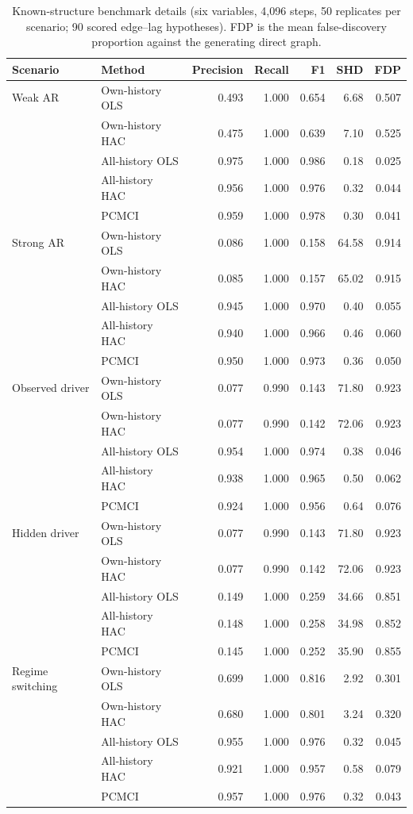 \documentclass[11pt]{article}
\begin{document}
\begin{table}[htbp]
\centering
\caption{Known-structure benchmark details (six variables, 4,096 steps, 50 replicates per scenario; 90 scored edge--lag hypotheses). FDP is the mean false-discovery proportion against the generating direct graph.}
\label{tab:s13}
\scriptsize
\begin{tabular}{@{}llrrrrr@{}}
\toprule
Scenario & Method & Precision & Recall & F1 & SHD & FDP \\
\midrule
Weak AR & Own-history OLS & 0.493 & 1.000 & 0.654 & 6.68 & 0.507 \\
 & Own-history HAC & 0.475 & 1.000 & 0.639 & 7.10 & 0.525 \\
 & All-history OLS & 0.975 & 1.000 & 0.986 & 0.18 & 0.025 \\
 & All-history HAC & 0.956 & 1.000 & 0.976 & 0.32 & 0.044 \\
 & PCMCI & 0.959 & 1.000 & 0.978 & 0.30 & 0.041 \\
\addlinespace
Strong AR & Own-history OLS & 0.086 & 1.000 & 0.158 & 64.58 & 0.914 \\
 & Own-history HAC & 0.085 & 1.000 & 0.157 & 65.02 & 0.915 \\
 & All-history OLS & 0.945 & 1.000 & 0.970 & 0.40 & 0.055 \\
 & All-history HAC & 0.940 & 1.000 & 0.966 & 0.46 & 0.060 \\
 & PCMCI & 0.950 & 1.000 & 0.973 & 0.36 & 0.050 \\
\addlinespace
Observed driver & Own-history OLS & 0.077 & 0.990 & 0.143 & 71.80 & 0.923 \\
 & Own-history HAC & 0.077 & 0.990 & 0.142 & 72.06 & 0.923 \\
 & All-history OLS & 0.954 & 1.000 & 0.974 & 0.38 & 0.046 \\
 & All-history HAC & 0.938 & 1.000 & 0.965 & 0.50 & 0.062 \\
 & PCMCI & 0.924 & 1.000 & 0.956 & 0.64 & 0.076 \\
\addlinespace
Hidden driver & Own-history OLS & 0.077 & 0.990 & 0.143 & 71.80 & 0.923 \\
 & Own-history HAC & 0.077 & 0.990 & 0.142 & 72.06 & 0.923 \\
 & All-history OLS & 0.149 & 1.000 & 0.259 & 34.66 & 0.851 \\
 & All-history HAC & 0.148 & 1.000 & 0.258 & 34.98 & 0.852 \\
 & PCMCI & 0.145 & 1.000 & 0.252 & 35.90 & 0.855 \\
\addlinespace
Regime switching & Own-history OLS & 0.699 & 1.000 & 0.816 & 2.92 & 0.301 \\
 & Own-history HAC & 0.680 & 1.000 & 0.801 & 3.24 & 0.320 \\
 & All-history OLS & 0.955 & 1.000 & 0.976 & 0.32 & 0.045 \\
 & All-history HAC & 0.921 & 1.000 & 0.957 & 0.58 & 0.079 \\
 & PCMCI & 0.957 & 1.000 & 0.976 & 0.32 & 0.043 \\
\bottomrule
\end{tabular}
\end{table}
\end{document}
